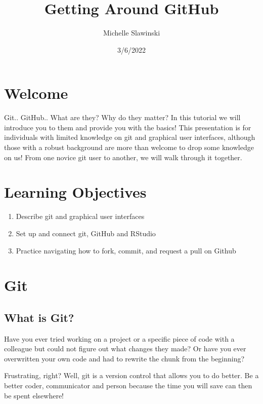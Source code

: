 \documentclass[
]{article}
\title{Getting Around GitHub}
\author{Michelle Slawinski}
\date{3/6/2022}
\providecommand{\tightlist}{%
  \setlength{\itemsep}{0pt}\setlength{\parskip}{0pt}}
\begin{document}
\maketitle

{
\setcounter{tocdepth}{2}
\tableofcontents
}
\hypertarget{welcome}{%
\section{Welcome}\label{welcome}}

Git.. GitHub.. What are they? Why do they matter? In this tutorial we
will introduce you to them and provide you with the basics! This
presentation is for individuals with limited knowledge on git and
graphical user interfaces, although those with a robust background are
more than welcome to drop some knowledge on us! From one novice git user
to another, we will walk through it together.

\hypertarget{learning-objectives}{%
\section{Learning Objectives}\label{learning-objectives}}

\begin{enumerate}
\def\labelenumi{\arabic{enumi}.}
\tightlist
\item
  Describe git and graphical user interfaces
\item
  Set up and connect git, GitHub and RStudio
\item
  Practice navigating how to fork, commit, and request a pull on Github
\end{enumerate}

\hypertarget{git}{%
\section{Git}\label{git}}

\hypertarget{what-is-git}{%
\subsection{What is Git?}\label{what-is-git}}

Have you ever tried working on a project or a specific piece of code
with a colleague but could not figure out what changes they made? Or
have you ever overwritten your own code and had to rewrite the chunk
from the beginning?

Frustrating, right? Well, git is a version control that allows you to do
better. Be a better coder, communicator and person because the time you
will save can then be spent elsewhere!
\end{document}
